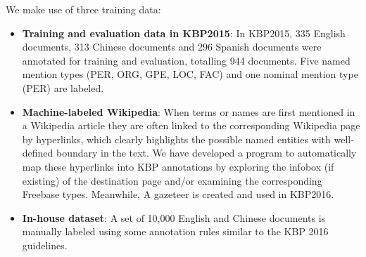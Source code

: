 \documentclass[11pt,a4paper]{article}
\begin{document}

We make use of three training data:

\begin{itemize}
	\item \textbf{Training and evaluation data in KBP2015}: In KBP2015, 335 English documents, 313 Chinese documents and 296 Spanish documents were annotated for training and evaluation, totalling 944 documents. Five named mention types (PER, ORG, GPE, LOC, FAC) and one nominal mention type (PER) are labeled. 
	
	\item \textbf{Machine-labeled Wikipedia}: When terms or names are first mentioned in a Wikipedia article they are often linked to the corresponding Wikipedia page by hyperlinks, which clearly highlights the possible named entities with well-defined boundary in the text. We have developed a program to automatically map these hyperlinks into KBP annotations by exploring the infobox (if existing) of the destination page and/or examining the corresponding Freebase types. Meanwhile, A gazeteer is created and used in KBP2016.
	
	\item \textbf{In-house dataset}: A set of 10,000 English and Chinese documents is manually labeled using some annotation rules similar to the KBP 2016 guidelines.
	
\end{itemize}


%
\end{document}
